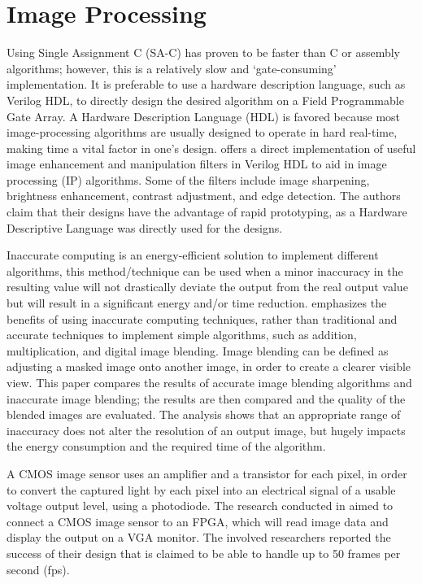 \section{Image Processing}
\par	Using Single Assignment C (SA-C) has proven to be faster than C or assembly algorithms; however, this is a relatively slow and ‘gate-consuming’ implementation. It is preferable to use a hardware description language, such as Verilog HDL, to directly design the desired algorithm on a Field Programmable Gate Array. A Hardware Description Language (HDL) is favored because most image-processing algorithms are usually designed to operate in hard real-time, making time a vital factor in one’s design. \cite{four} offers a direct implementation of useful image enhancement and manipulation filters in Verilog HDL to aid in image processing (IP) algorithms. Some of the filters include image sharpening, brightness enhancement, contrast adjustment, and edge detection. The authors claim that their designs have the advantage of rapid prototyping, as a Hardware Descriptive Language was directly used for the designs.  \newline
\par	Inaccurate computing is an energy-efficient solution to implement different algorithms, this method/technique can be used when a minor inaccuracy in the resulting value will not drastically deviate the output from the real output value but will result in a significant energy and/or time reduction. \cite{seven} emphasizes the benefits of using inaccurate computing techniques, rather than traditional and accurate techniques to implement simple algorithms, such as addition, multiplication, and digital image blending. Image blending can be defined as adjusting a masked image onto another image, in order to create a clearer visible view. This paper compares the results of accurate image blending algorithms and inaccurate image blending; the results are then compared and the quality of the blended images are evaluated. The analysis shows that an appropriate range of inaccuracy does not alter the resolution of an output image, but hugely impacts the energy consumption and the required time of the algorithm. \newline
\par	A CMOS image sensor uses an amplifier and a transistor for each pixel, in order to convert the captured light by each pixel into an electrical signal of a usable voltage output level, using a photodiode. The research conducted in \cite{nine} aimed to connect a CMOS image sensor to an FPGA, which will read image data and display the output on a VGA monitor. The involved researchers reported the success of their design that is claimed to be able to handle up to 50 frames per second (fps).  \newline
